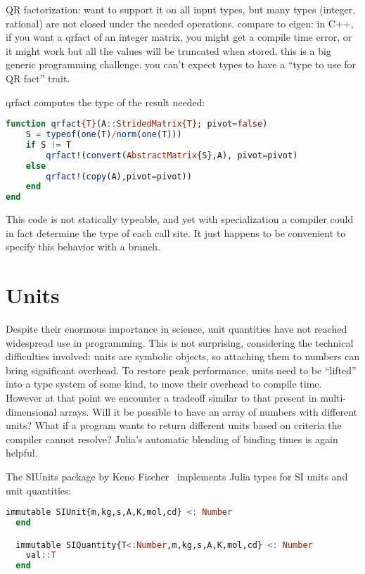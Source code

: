 QR factorization: want to support it on all input types, but many
types (integer, rational) are not closed under the needed operations.
compare to eigen: in C++, if you want a qrfact of an integer matrix,
you might get a compile time error, or it might work but all the values
will be truncated when stored. this is a big generic programming
challenge. you can't expect types to have a ``type to use for QR fact''
trait.

qrfact computes the type of the result needed:

\begin{singlespace}
\begin{lstlisting}[language=julia]
function qrfact{T}(A::StridedMatrix{T}; pivot=false)
    S = typeof(one(T)/norm(one(T)))
    if S != T
        qrfact!(convert(AbstractMatrix{S},A), pivot=pivot)
    else
        qrfact!(copy(A),pivot=pivot))
    end
end
\end{lstlisting}
\end{singlespace}

This code is not statically typeable, and yet with specialization a
compiler could in fact determine the type of each call site.
It just happens to be convenient to specify this behavior with a
branch.

\section{Units}

Despite their enormous importance in science, unit quantities have
not reached widespread use in programming.
This is not surprising, considering the technical difficulties involved:
units are symbolic objects, so attaching them to numbers can bring
significant overhead.
To restore peak performance, units need to be ``lifted'' into a type
system of some kind, to move their overhead to compile time.
However at that point we encounter a tradeoff similar to that present
in multi-dimensional arrays.
Will it be possible to have an array of numbers with different units?
What if a program wants to return different units based on criteria
the compiler cannot resolve?
Julia's automatic blending of binding times is again helpful.

The SIUnits package by Keno Fischer~\cite{Fischer:2014si} implements
Julia types for SI units and unit quantities:

\begin{singlespace}
\begin{lstlisting}[language=julia]
  immutable SIUnit{m,kg,s,A,K,mol,cd} <: Number
  end

  immutable SIQuantity{T<:Number,m,kg,s,A,K,mol,cd} <: Number
    val::T
  end
\end{lstlisting}
\end{singlespace}

